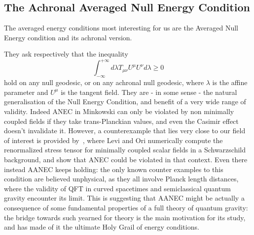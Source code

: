 \subsection{The Achronal Averaged Null Energy Condition}

The averaged energy conditions most interesting for us are the Averaged Null Energy condition and its achronal version.

\noindent
They ask respectively that the inequality
\begin{equation}
    \label{eq:ANEC}
    \int_{-\infty}^{+\infty} d\lambda T_{\mu\nu}U^{\mu}U^{\nu} d\lambda \ge 0    
\end{equation}
hold on any null geodesic, or on any achronal null geodesic, where \(\lambda\) is the affine parameter and \(U^{\mu}\) is the tangent field. They are - in some sense - the natural generalisation of the Null Energy Condition, and benefit of a very wide range of validity. 
\noindent
Indeed ANEC in Minkowski can only be violated by non minimally coupled fields if they take trans-Planckian values, and even the Casimir effect doesn't invalidate it.
However, a counterexample that lies very close to our field of interest is provided by~\cite[]{levi2016versatile}, where Levi and Ori numerically compute the renormalized stress tensor for minimally coupled scalar fields in a Schwarzschild background, and show that ANEC could be violated in that context. 
Even there instead AANEC keeps holding: the only known counter examples to this condition are believed unphysical, as they all involve Planck length distances, where the validity of QFT in curved spacetimes and semiclassical quantum gravity encounter its limit. This is suggesting that AANEC might be actually a consequence of some fundamental properties of a full theory of quantum gravity: the bridge towards such yearned for theory is the main motivation for its study, and has made of it the ultimate Holy Grail of energy conditions.

